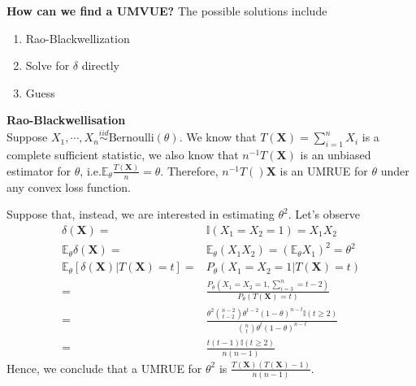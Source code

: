\begin{note}
    \textbf{How can we find a UMVUE?} The possible solutions include
    \begin{enumerate}[{(a)}]
        \item Rao-Blackwellization
        \item Solve for $\delta$ directly
        \item Guess
    \end{enumerate}
\end{note}


\begin{example}
    \textbf{Rao-Blackwellisation}\\
    Suppose $X_1,\cdots,X_n\overset{iid}{\sim}\text{Bernoulli}(\theta)$.
    We know that $T(\boldsymbol{X})=\sum_{i=1}^nX_i$ is a complete sufficient statistic,
    we also know that $n^{-1}T(\boldsymbol{X})$ is an unbiased estimator for $\theta$,
    i.e.$\mathbb{E}_\theta\frac{T(\boldsymbol{X})}{n}=\theta$.
    Therefore, $n^{-1}T()\boldsymbol{X}$ is an UMRUE for $\theta$ under any convex loss function.

    Suppose that, instead, we are interested in estimating $\theta^2$. 
    Let's observe 
    \begin{align}
        \delta(\boldsymbol{X})=&\mathbb{I}(X_1=X_2=1)=X_1X_2\\
        \mathbb{E}_\theta\delta(\boldsymbol{X})=&\mathbb{E}_\theta(X_1X_2)=(\mathbb{E}_\theta X_1)^2=\theta^2\\
        \mathbb{E}_\theta[\delta(\boldsymbol{X})|T(\boldsymbol{X})=t]
        =& P_\theta(X_1=X_2=1|T(\boldsymbol{X})=t)\\
        =& \frac{P_\theta(X_1=X_2=1, \sum_{i=3}^n = t-2)}{P_\theta(T(\boldsymbol{X})=t)}\\
        =& \frac{\theta^2\binom{n-2}{t-2}\theta^{t-2}(1-\theta)^{n-t}\mathbb{I}(t\geq 2)}{\binom{n}{t}\theta^t(1-\theta)^{n-t}}\\
        =& \frac{t(t-1)\mathbb{I}(t\geq 2)}{n(n-1)}
    \end{align}
    Hence, we conclude that a UMRUE for $\theta^2$ is $\frac{T(\boldsymbol{X})(T(\boldsymbol{X})-1)}{n(n-1)}$.
\end{example}

